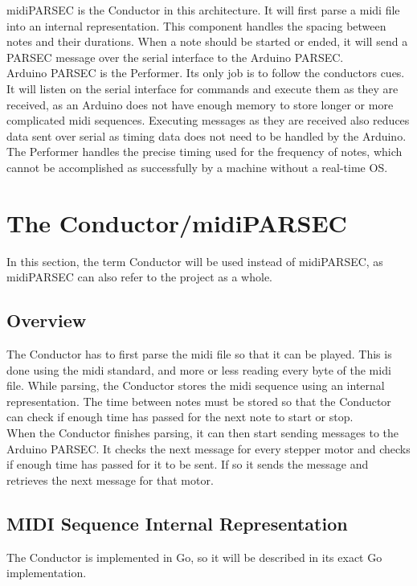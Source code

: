 \documentclass{article}
\begin{document}
\noindent midiPARSEC is the Conductor in this architecture. It will first parse a midi file into an internal representation. This component handles the spacing between notes and their durations. When a note should be started or ended, it will send a PARSEC message over the serial interface to the Arduino PARSEC.\\

\noindent Arduino PARSEC is the Performer. Its only job is to follow the conductors cues. It will listen on the serial interface for commands and execute them as they are received, as an Arduino does not have enough memory to store longer or more complicated midi sequences. Executing messages as they are received also reduces data sent over serial as timing data does not need to be handled by the Arduino. The Performer handles the precise timing used for the frequency of notes, which cannot be accomplished as successfully by a machine without a real-time OS.

\section{The Conductor/midiPARSEC}
\noindent In this section, the term Conductor will be used instead of midiPARSEC, as midiPARSEC can also refer to the project as a whole.

\subsection{Overview}
\noindent The Conductor has to first parse the midi file so that it can be played. This is done using the midi standard, and more or less reading every byte of the midi file. While parsing, the Conductor stores the midi sequence using an internal representation. The time between notes must be stored so that the Conductor can check if enough time has passed for the next note to start or stop.\\

\noindent When the Conductor finishes parsing, it can then start sending messages to the Arduino PARSEC. It checks the next message for every stepper motor and checks if enough time has passed for it to be sent. If so it sends the message and retrieves the next message for that motor.

\subsection{MIDI Sequence Internal Representation}
\noindent The Conductor is implemented in Go, so it will be described in its exact Go implementation.
\end{document}
